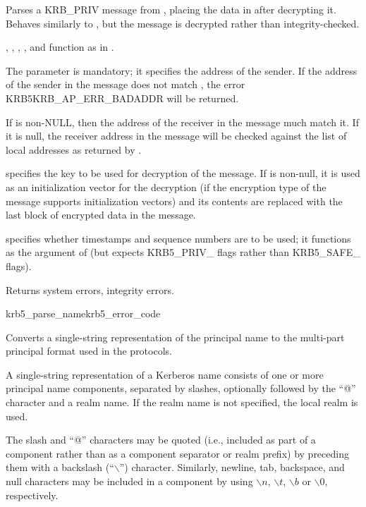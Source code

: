 Parses a KRB_PRIV message from , placing the data in
 after decrypting it.  Behaves similarly to
, but the message is decrypted rather than
integrity-checked.

, , ,
,  and 
function as in .


The  parameter is mandatory;  it
specifies the address of the sender.  If the address of the sender in
the message does not match , the error
KRB5KRB_AP_ERR_BADADDR will be returned.

If  is non-NULL, then the address of the receiver
in the message much match it.  If it is null, the receiver address in
the message will be checked against the list of local addresses as
returned by .

 specifies the key to be used for decryption of the
message.  If  is non-null, it is used as an
initialization vector for the decryption (if the encryption type of
the message supports initialization vectors) and its contents are
replaced with the last block of encrypted data in the message.

 specifies whether timestamps and sequence
numbers are to be used; it functions as the 
argument of  (but expects KRB5_PRIV_ flags
rather than KRB5_SAFE_ flags).

Returns system errors, integrity errors.

\begin{funcdecl}{krb5_parse_name}{krb5_error_code}{\funcin}
\funcout
{}
\end{funcdecl}

Converts a single-string representation  of the
principal name to the multi-part principal format used in the protocols.

A single-string representation of a Kerberos name consists of one or
more principal name components, separated by slashes, optionally
followed by the ``@'' character and a realm name.  If the realm name
is not specified, the local realm is used.

The slash and ``@'' characters may be quoted (i.e., included as part
of a component rather than as a component separator or realm prefix)
by preceding them with a backslash (``$\backslash$'') character.
Similarly, newline, tab, backspace, and null characters may be
included in a component by using $\backslash{}n$, $\backslash{}t$,
$\backslash{}b$ or $\backslash{}0$, respectively.

